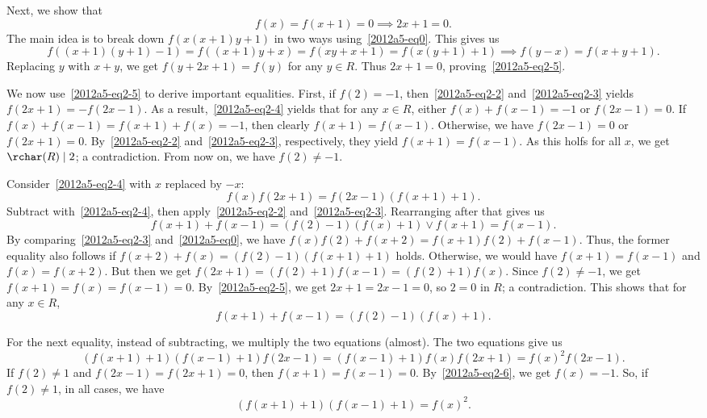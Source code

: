 Next, we show that
\[ f(x) = f(x + 1) = 0 \implies 2x + 1 = 0. \tag{2.5}\label{2012a5-eq2-5} \]
The main idea is to break down $f(x(x + 1)y + 1)$ in two ways using~\eqref{2012a5-eq0}.
This gives us
\[ f((x + 1)(y + 1) - 1) = f((x + 1) y + x) = f(xy + x + 1) = f(x(y + 1) + 1) \implies f(y - x) = f(x + y + 1). \]
Replacing $y$ with $x + y$, we get $f(y + 2x + 1) = f(y)$ for any $y \in R$.
Thus $2x + 1 = 0$, proving~\eqref{2012a5-eq2-5}.

We now use~\eqref{2012a5-eq2-5} to derive important equalities.
First, if $f(2) = -1$, then~\eqref{2012a5-eq2-2} and~\eqref{2012a5-eq2-3} yields $f(2x + 1) = -f(2x - 1)$.
As a result,~\eqref{2012a5-eq2-4} yields that for any $x \in R$, either $f(x) + f(x - 1) = -1$ or $f(2x - 1) = 0$.
If $f(x) + f(x - 1) = f(x + 1) + f(x) = -1$, then clearly $f(x + 1) = f(x - 1)$.
Otherwise, we have $f(2x - 1) = 0$ or $f(2x + 1) = 0$.
By~\eqref{2012a5-eq2-2} and~\eqref{2012a5-eq2-3}, respectively, they yield $f(x + 1) = f(x - 1)$.
As this holfs for all $x$, we get $\rchar(R) \mid 2$; a contradiction.
From now on, we have $f(2) \neq -1$.

Consider~\eqref{2012a5-eq2-4} with $x$ replaced by $-x$:
\[ f(x) f(2x + 1) = f(2x - 1) (f(x + 1) + 1). \]
Subtract with~\eqref{2012a5-eq2-4}, then apply~\eqref{2012a5-eq2-2} and~\eqref{2012a5-eq2-3}.
Rearranging after that gives us
\[ f(x + 1) + f(x - 1) = (f(2) - 1)(f(x) + 1) \vee f(x + 1) = f(x - 1). \]
By comparing~\eqref{2012a5-eq2-3} and~\eqref{2012a5-eq0}, we have $f(x) f(2) + f(x + 2) = f(x + 1) f(2) + f(x - 1)$.
Thus, the former equality also follows if $f(x + 2) + f(x) = (f(2) - 1)(f(x + 1) + 1)$ holds.
Otherwise, we would have $f(x + 1) = f(x - 1)$ and $f(x) = f(x + 2)$.
But then we get $f(2x + 1) = (f(2) + 1) f(x - 1) = (f(2) + 1) f(x)$.
Since $f(2) \neq -1$, we get $f(x + 1) = f(x) = f(x - 1) = 0$.
By~\eqref{2012a5-eq2-5}, we get $2x + 1 = 2x - 1 = 0$, so $2 = 0$ in $R$; a contradiction.
This shows that for any $x \in R$,
\[ f(x + 1) + f(x - 1) = (f(2) - 1)(f(x) + 1). \tag{2.6}\label{2012a5-eq2-6} \]

For the next equality, instead of subtracting, we multiply the two equations (almost).
The two equations give us
\[ (f(x + 1) + 1)(f(x - 1) + 1) f(2x - 1) = (f(x - 1) + 1) f(x) f(2x + 1) = f(x)^2 f(2x - 1). \]
If $f(2) \neq 1$ and $f(2x - 1) = f(2x + 1) = 0$, then $f(x + 1) = f(x - 1) = 0$.
By~\eqref{2012a5-eq2-6}, we get $f(x) = -1$.
So, if $f(2) \neq 1$, in all cases, we have
\[ (f(x + 1) + 1)(f(x - 1) + 1) = f(x)^2. \tag{2.7}\label{2012a5-eq2-7} \]

